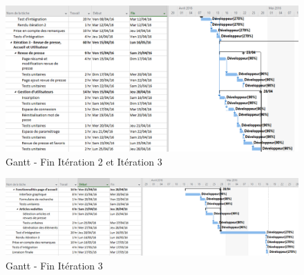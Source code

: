     \begin{figure}[H]
        \centering
        \includegraphics[width=\textwidth, angle=90]{figure/gantt4.png}
            \caption{Gantt - Fin Itération 2 et Itération 3}
            \label{fig:gantt}
    \end{figure}

    \begin{figure}[H]
        \centering
        \includegraphics[width=\textwidth, angle=90]{figure/gantt5.png}
            \caption{Gantt - Fin Itération 3}
            \label{fig:gantt}
    \end{figure}